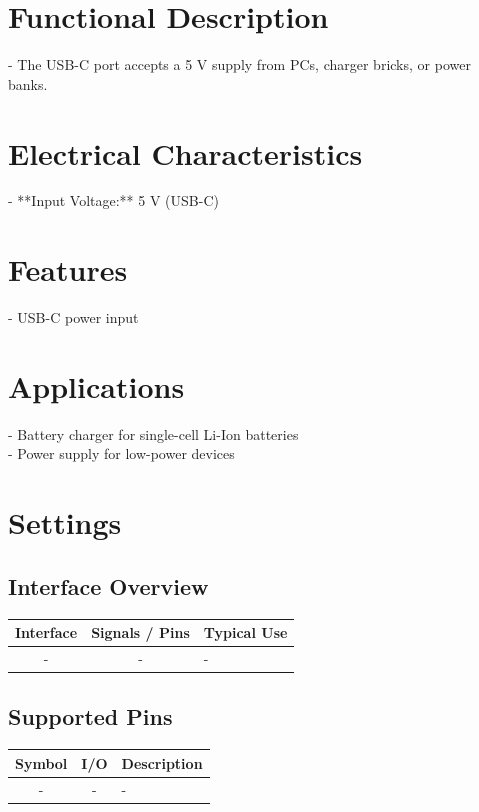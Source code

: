 \documentclass[10pt]{article}
\begin{document}
\vspace{1.0em}
\FloatBarrier %



\section*{Functional Description}
- The USB-C port accepts a 5 V supply from PCs, charger bricks, or power banks.\\ 

\section*{Electrical Characteristics}
- **Input Voltage:** 5 V (USB-C)\\ 

\section*{Features}
- USB-C power input\\ 



\section*{Applications}
- Battery charger for single-cell Li-Ion batteries\\ 
- Power supply for low-power devices\\ 

\vspace{1em}



\section*{Settings}

\subsection*{Interface Overview}
\begin{tabularx}{\textwidth}{|c|c|>{\RaggedRight\arraybackslash}X|}
\hline
\rowcolor{headergray}
Interface & Signals / Pins & Typical Use \\
\hline
- & - & - \\
\hline
\end{tabularx}


\subsection*{Supported Pins}
\begin{tabularx}{\textwidth}{|c|c|>{\RaggedRight\arraybackslash}X|}
\hline
\rowcolor{headergray}
Symbol & I/O & Description \\
\hline
- & - & - \\
\hline
\end{tabularx}
\end{document}
